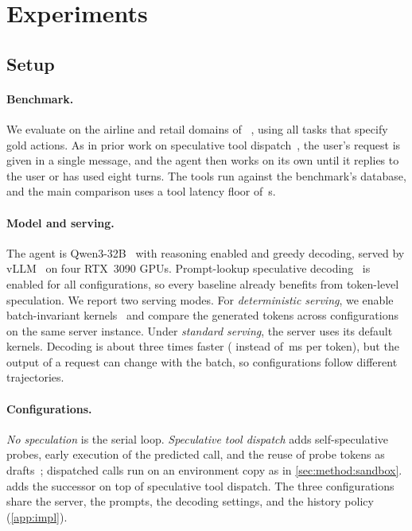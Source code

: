\section{Experiments}
\label{sec:experiments}

\subsection{Setup}
\label{sec:exp:setup}

\paragraph{Benchmark.}
We evaluate on the airline and retail domains of \taubench~\citep{barres2025tau2}, using all \StdPlanned{} tasks that specify gold actions.
As in prior work on speculative tool dispatch~\citep{bai2026spork,anon2026eta}, the user's request is given in a single message, and the agent then works on its own until it replies to the user or has used eight turns.
The tools run against the benchmark's database, and the main comparison uses a tool latency floor of \ToolLowFloor\,s.

\paragraph{Model and serving.}
The agent is Qwen3-32B~\citep{qwen2025qwen3} with reasoning enabled and greedy decoding, served by vLLM~\citep{kwon2023vllm} on four RTX~3090 GPUs.
Prompt-lookup speculative decoding~\citep{saxena2023pld} is enabled for all configurations, so every baseline already benefits from token-level speculation.
We report two serving modes.
For \emph{deterministic serving}, we enable batch-invariant kernels~\citep{he2025nondeterminism} and compare the generated tokens across configurations on the same server instance.
Under \emph{standard serving}, the server uses its default kernels.
Decoding is about three times faster (\SpdStdMsSolo{} instead of \SpdDetMsSolo\,ms per token), but the output of a request can change with the batch, so configurations follow different trajectories.

\paragraph{Configurations.}
\emph{No speculation} is the serial loop.
\emph{Speculative tool dispatch} adds self-speculative probes, early execution of the predicted call, and the reuse of probe tokens as drafts~\citep{bai2026spork}; dispatched calls run on an environment copy as in \cref{sec:method:sandbox}.
\method adds the successor on top of speculative tool dispatch.
The three configurations share the server, the prompts, the decoding settings, and the history policy (\cref{app:impl}).

